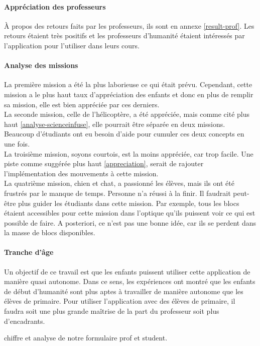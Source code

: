 \paragraph{Appréciation des professeurs}
À propos des retours faits par les professeurs, ils sont en annexe \ref{result-prof}. Les retours étaient très positifs et les professeurs d'humanité étaient intéressés par l'application pour l'utiliser dans leurs cours.

\paragraph{Analyse des missions}
La première mission a été la plus laborieuse ce qui était prévu. Cependant, cette mission a le plus haut taux d'appréciation des enfants et donc en plus de remplir sa mission, elle est bien appréciée par ces derniers.\\

La seconde mission, celle de l'hélicoptère, a été appréciée, mais comme cité plus haut \ref{analyse-scienceinfuse}, elle pourrait être séparée en deux missions. Beaucoup d'étudiants ont eu besoin d'aide pour cumuler ces deux concepts en une fois.\\

La troisième mission, soyons courtois, est la moins appréciée, car trop facile. Une piste comme suggérée plus haut \ref{appreciation}, serait de rajouter l'implémentation des mouvements à cette mission.\\

La quatrième mission, chien et chat, a passionné les élèves, mais ils ont été frustrés par le manque de temps. Personne n'a réussi à la finir. Il faudrait peut-être plus guider les étudiants dans cette mission. Par exemple, tous les blocs étaient accessibles pour cette mission dans l'optique qu'ils puissent voir ce qui est possible de faire. A posteriori, ce n'est pas une bonne idée, car ils se perdent dans la masse de blocs disponibles.

\paragraph{Tranche d'âge}
\label{trancheage}
Un objectif de ce travail est que les enfants puissent utiliser cette application de manière quasi autonome. Dans ce sens, les expériences ont montré que les enfants de début d'humanité sont plus aptes à travailler de manière autonome que les élèves de primaire.
Pour utiliser l'application avec des élèves de primaire, il faudra soit une plus grande maîtrise de la part du professeur soit plus d'encadrants.






chiffre et analyse de notre formulaire prof et student.

